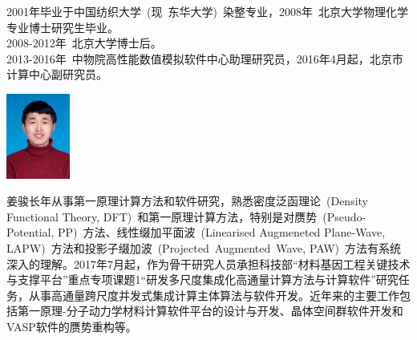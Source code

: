 \documentclass{article}      %
\newcommand{\upcite}[1]{\hspace{0ex}\textsuperscript{\cite{#1}}} %
\begin{document}
\begin{minipage}[b]{0.75\textwidth}
{\fontsize{11.0pt}{10.0pt}\selectfont{姜骏，北京市计算中心~~副研究员}}
\vskip 4pt
2001年毕业于中国纺织大学~(现~东华大学)~染整专业，2008年~北京大学物理化学专业博士研究生毕业。\\
2008-2012年~北京大学博士后。\\
2013-2016年~中物院高性能数值模拟软件中心助理研究员，2016年4月起，北京市计算中心副研究员。
\end{minipage}
\hskip 15pt
\begin{minipage}[b]{0.20\textwidth}
	\vspace{17pt}
\includegraphics[height=1.1in]{Figures/Person_Photo.JPG}
\end{minipage}
\vskip 12pt
姜骏长年从事第一原理计算方法和软件研究，熟悉密度泛函理论~(\textrm{Density Functional Theory, DFT})~和第一原理计算方法，特别是对赝势~(\textrm{Pseudo-Potential, PP})~方法、线性缀加平面波~(\textrm{Linearised Augmeneted Plane-Wave, LAPW})~方法和投影子缀加波~(\textrm{Projected~Augmented~Wave, PAW})~方法有系统深入的理解。2017年7月起，作为骨干研究人员承担科技部“材料基因工程关键技术与支撑平台”重点专项课题1“研发多尺度集成化高通量计算方法与计算软件”研究任务，从事高通量跨尺度并发式集成计算主体算法与软件开发。近年来的主要工作包括第一原理-分子动力学材料计算软件平台的设计与开发、晶体空间群软件开发和VASP软件的赝势重构等。



\end{document}
